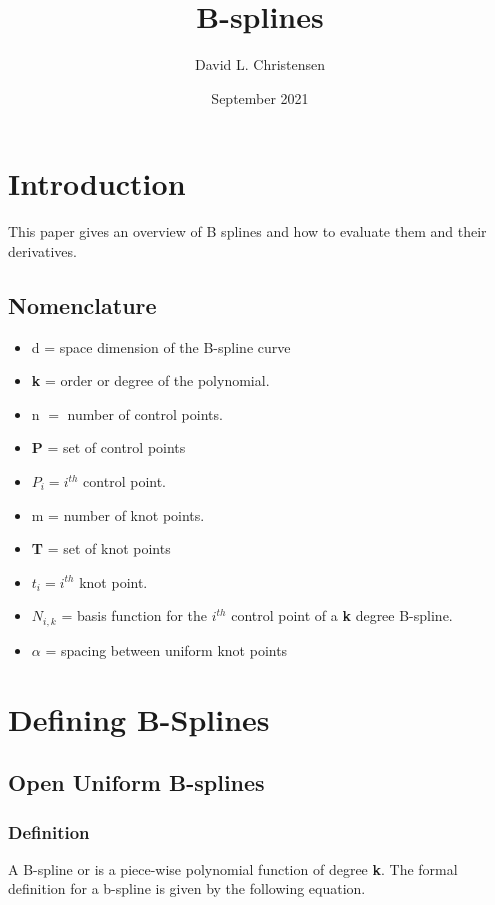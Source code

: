 \documentclass{article}
\title{B-splines}
\author{David L. Christensen}
\date{September 2021}
\begin{document}
\maketitle

\section{Introduction}
This paper gives an overview of B splines and how to evaluate them and their derivatives.

\subsection{Nomenclature}


\begin{itemize}
  \item[] d = space dimension of the B-spline curve
  \item[] \textbf{k} = order or degree of the polynomial.
  \item[] n \(=\) number of control points.
  \item[] \textbf{P} = set of control points
  \item[] \(P_i = i^{th}\) control point.
  \item[] m = number of knot points.
  \item[] \textbf{T} = set of knot points 
  \item[] \(t_i = i^{th}\) knot point.
  \item[] \(N_{i , k}\) = basis function for the \(i^{th}\) control point of a \textbf{k} degree B-spline.
  \item[] \(\alpha\) = spacing between uniform knot points
\end{itemize}

\section{Defining B-Splines}

\subsection{Open Uniform B-splines}

\subsubsection{Definition}

 A B-spline or  is a piece-wise polynomial function of degree \textbf{k}. The formal definition for a b-spline is given by the following equation.
 
\end{document}
